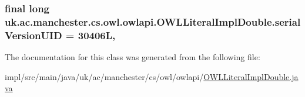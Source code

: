 \hypertarget{classuk_1_1ac_1_1manchester_1_1cs_1_1owl_1_1owlapi_1_1_o_w_l_literal_impl_double_a25d76bce7fec4faa635f597ded20b1ba}{
\subsubsection[{serial\-Version\-U\-I\-D}]{\setlength{\rightskip}{0pt plus 5cm}final long uk.\-ac.\-manchester.\-cs.\-owl.\-owlapi.\-O\-W\-L\-Literal\-Impl\-Double.\-serial\-Version\-U\-I\-D = 30406\-L\hspace{0.3cm}{\ttfamily [static]}, {\ttfamily [private]}}}\label{classuk_1_1ac_1_1manchester_1_1cs_1_1owl_1_1owlapi_1_1_o_w_l_literal_impl_double_a25d76bce7fec4faa635f597ded20b1ba}


The documentation for this class was generated from the following file\-:\begin{DoxyCompactItemize}
\item 
impl/src/main/java/uk/ac/manchester/cs/owl/owlapi/\hyperlink{_o_w_l_literal_impl_double_8java}{O\-W\-L\-Literal\-Impl\-Double.\-java}\end{DoxyCompactItemize}
